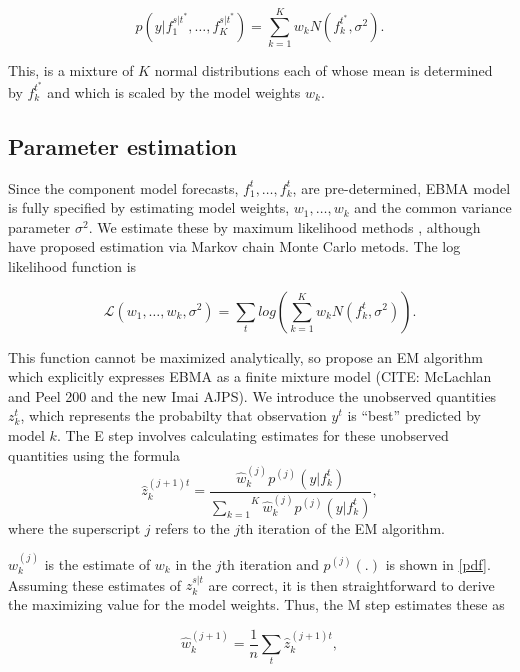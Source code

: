\documentclass[12pt,fullpage,endnotes]{article}
\begin{document}
\begin{equation}
\label{pdf}p(y|f_1^{s|t^\ast},
\ldots, f_K^{s|t^\ast}) = \overset{K}{\underset{k=1}{\sum}} w_k
N(f_k^{t^\ast}, \sigma^2).
\end{equation}

\noindent This, is a mixture of $K$ normal distributions each of whose mean is
determined by $f_k^{t^\ast}$ and which is scaled by the model weights
$w_k$.

\subsection{Parameter estimation}

Since the component model forecasts, $f^t_1, \ldots, f^t_k$, are
pre-determined, EBMA model is fully specified by estimating model
weights, $w_1, \ldots, w_k$ and the common variance parameter
$\sigma^2$.  We estimate these by maximum likelihood methods
\citep{Raftery:2005}, although \citet{Vrugt:2008} have proposed
estimation via Markov chain Monte Carlo metods.  The log likelihood
function is

\begin{equation}
\mathcal{L}(w_1, \ldots, w_k, \sigma^2)=\sum_tlog\left(\sum_{k=1}^Kw_kN(f^t_k, \sigma^2) \right).
\end{equation}


\noindent This function cannot be maximized analytically, so
\citet{Raftery:2005} propose an EM algorithm which explicitly
expresses EBMA as a finite mixture model (CITE: McLachlan and Peel 200
and the new Imai AJPS).  We introduce the unobserved quantities
$z_k^t$, which represents the probabilty that observation $y^t$ is
``best'' predicted by model $k$.  The E step involves calculating
estimates for these unobserved quantities using the formula
\begin{equation}
\label{E-step}
\hat{z}^{(j+1)t}_{k} = \frac{\hat{w}^{(j)}_k
p^{(j)}(y|f_{k}^{t})}{\overset{K}{\underset{k=1}{\sum}}\hat{w}^{(j)}_kp^{(j)}(y|f_{k}^{t})},
\end{equation}
\noindent where the superscript $j$ refers to the $j$th iteration of
the EM algorithm.

$w_k^{(j)}$ is the estimate of $w_k$ in the $j$th iteration and
$p^{(j)}(.)$ is shown in \eqref{pdf}.  Assuming these estimates of
$z_{k}^{s|t}$ are correct, it is then straightforward to derive the
maximizing value for the model weights. Thus, the M step estimates
these as 

\begin{equation}
\label{M-step}
\hat{w}^{(j+1)}_k=\frac{1}{n}\underset{t}{\sum}\hat{z}^{(j+1)t}_{k},
\end{equation}
\end{document}
